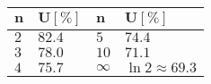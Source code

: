 \begin{multicols}{2}
\begin{tabularx}{0.8\linewidth}{|p{1cm}|X||p{1cm}|X|} \hline
	$\mathbf{n}$ & $\mathbf{U [ \% ]}$ & $\mathbf{n}$ & $\mathbf{U [ \% ]}$ \\ \hline \hline
	$2$ & $82.4$ & $5$ & $74.4$ \\
	$3$ & $78.0$ & $10$ & $71.1$ \\
	$4$ & $75.7$ & $\infty$ & $\ln 2 \approx 69.3$ \\ \hline
\end{tabularx}

\end{multicols}